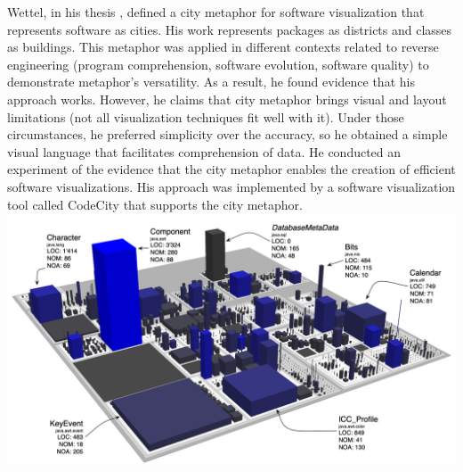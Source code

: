 \newpage

Wettel, in his thesis \cite{Wettel2011}, defined a city metaphor for software visualization that represents software as cities. His work represents packages as districts and classes as buildings. This metaphor was applied in different contexts related to reverse engineering (program comprehension, software evolution, software quality) to demonstrate metaphor's versatility. As a result, he found evidence that his approach works. However, he claims that city metaphor brings visual and layout limitations (not all visualization techniques fit well with it). Under those circumstances, he preferred simplicity over the accuracy, so he obtained a simple visual language that facilitates comprehension of data. He conducted an experiment of the evidence that the city metaphor enables the creation of efficient software visualizations. His approach was implemented by a software visualization tool called CodeCity that supports the city metaphor. 
\includegraphics[width=\textwidth]{CodeCity.png}

